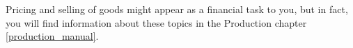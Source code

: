 Pricing and selling of goods might appear as a financial task to you, but in fact, you will find information about these topics in the Production chapter \ref{production_manual}.


